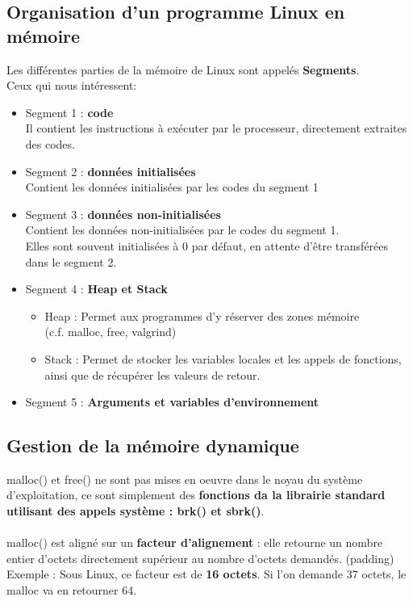 \documentclass{article}
\newcommand{\insertslide}[2]{
\begin{center}
    \fbox{\texttt{[image: \#1]}}
\end{center}
}
\begin{document}
    \subsection{Organisation d'un programme Linux en mémoire}
            Les différentes parties de la mémoire de Linux sont appelés \textbf{Segments}.\\
            Ceux qui nous intéressent:
            \begin{itemize}
                \item Segment 1 : \textbf{code}\\
                Il contient les instructions à exécuter par le processeur, directement extraites des codes.
                \item Segment 2 : \textbf{données initialisées}\\
                Contient les données initialisées par les codes du segment 1
                \item Segment 3 : \textbf{données non-initialisées}\\
                Contient les données non-initialisées par le codes du segment 1.\\
                Elles sont souvent initialisées à 0 par défaut, en attente d'être transférées dans le segment 2.
                \item Segment 4 : \textbf{Heap et Stack}
                \begin{itemize}
                    \item Heap : Permet aux programmes d'y réserver des zones mémoire\\(c.f. malloc, free, valgrind)
                    \item Stack : Permet de stocker les variables locales et les appels de fonctions, ainsi que de récupérer les valeurs de retour.
                \end{itemize}
                \item Segment 5 : \textbf{Arguments et variables d'environnement}
            \end{itemize}
        \insertslide{Slides/CM3}{6}
\pagebreak
    \subsection{Gestion de la mémoire dynamique}
        malloc() et free() ne sont pas mises en oeuvre dans le noyau du système d'exploitation, ce sont simplement des \textbf{fonctions da la librairie standard utilisant des appels système : brk() et sbrk()}.\\\\
        malloc() est aligné sur un \textbf{facteur d'alignement} : elle retourne un nombre entier d'octets directement supérieur au nombre d'octets demandés. (padding)\\
        Exemple : Sous Linux, ce facteur est de \textbf{16 octets}. Si l'on demande 37 octets, le malloc va en retourner 64.
\end{document}
